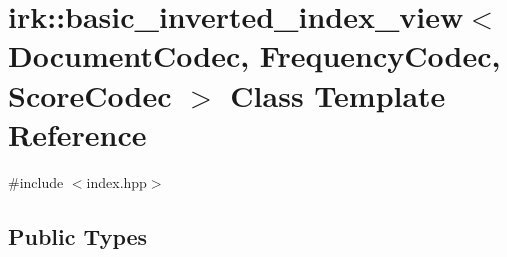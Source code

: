 \hypertarget{classirk_1_1basic__inverted__index__view}{}\section{irk\+:\+:basic\+\_\+inverted\+\_\+index\+\_\+view$<$ Document\+Codec, Frequency\+Codec, Score\+Codec $>$ Class Template Reference}
\label{classirk_1_1basic__inverted__index__view}


{\ttfamily \#include $<$index.\+hpp$>$}

\subsection*{Public Types}
